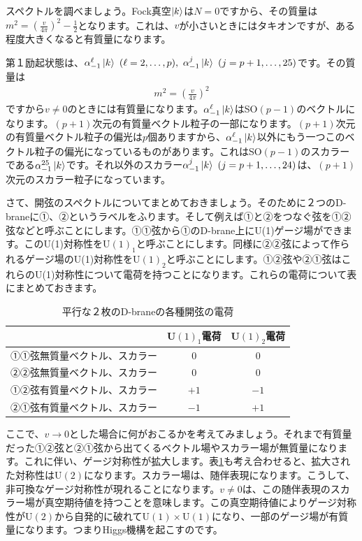 \documentclass[report,paper=a4, fontsize=12pt, line_length=16cm, number_of_lines=34,dvipdfmx]{jlreq}
\numberwithin{equation}{chapter}
\numberwithin{equation}{section}
\begin{document}
スペクトルを調べましょう。Fock真空$\ket{k}$は$N=0$ですから、その質量は$m^2=\left( \frac{v}{4\pi} \right)^2-\frac{1}{2}$となります。これは、$v$が小さいときにはタキオンですが、ある程度大きくなると有質量になります。

第１励起状態は、$\alpha_{-1}^{\ell}\ket{k}\  (\ell=2,\dots,p),\ 
\alpha_{-1}^{j}\ket{k}\ (j=p+1,\dots,25)$です。その質量は
\begin{align}
  m^2=\left( \frac{v}{4\pi} \right)^2
\end{align}
ですから$v\ne 0$のときには有質量になります。$\alpha_{-1}^{\ell}\ket{k}$はSO$(p-1)$のベクトルになります。$(p+1)$次元の有質量ベクトル粒子の一部になります。$(p+1)$次元の有質量ベクトル粒子の偏光は$p$個ありますから、$\alpha_{-1}^{\ell}\ket{k}$以外にもう一つこのベクトル粒子の偏光になっているものがあります。これはSO$(p-1)$のスカラーである$\alpha_{-1}^{25}\ket{k}$です。それ以外のスカラー$\alpha_{-1}^{j}\ket{k}\ (j=p+1,\dots,24)$は、$(p+1)$次元のスカラー粒子になっています。

さて、開弦のスペクトルについてまとめておきましょう。そのために２つのD-braneに①、②というラベルをふります。そして例えば①と②をつなぐ弦を①②弦などと呼ぶことにします。①①弦から①のD-brane上にU(1)ゲージ場ができます。このU(1)対称性をU$(1)_1$と呼ぶことにします。同様に②②弦によって作られるゲージ場のU(1)対称性をU$(1)_2$と呼ぶことにします。①②弦や②①弦はこれらのU(1)対称性について電荷を持つことになります。これらの電荷について表にまとめておきます。
\begin{table}[htbp]
  \centering
  \begin{tabular}{|c|c|c|}\hline
    & U$(1)_1$電荷 & U$(1)_2$電荷\\ \hline
    ①①弦無質量ベクトル、スカラー & 0 & 0 \\ \hline
    ②②弦無質量ベクトル、スカラー & 0 & 0 \\ \hline
    ①②弦有質量ベクトル、スカラー & $+1$ & $-1$ \\ \hline
    ②①弦有質量ベクトル、スカラー & $-1$ & $+1$ \\ \hline
  \end{tabular}
  \caption{平行な２枚のD-braneの各種開弦の電荷}
  \label{tab:charges}
\end{table}

ここで、$v\to 0$とした場合に何がおこるかを考えてみましょう。それまで有質量だった①②弦と②①弦から出てくるベクトル場やスカラー場が無質量になります。これに伴い、ゲージ対称性が拡大します。表\ref{tab:charges}も考え合わせると、拡大された対称性はU$(2)$になります。スカラー場は、随伴表現になります。こうして、非可換なゲージ対称性が現れることになります。$v\ne 0$は、この随伴表現のスカラー場が真空期待値を持つことを意味します。この真空期待値によりゲージ対称性がU$(2)$から自発的に破れてU$(1)\times $U$(1)$になり、一部のゲージ場が有質量になります。つまりHiggs機構を起こすのです。
\end{document}
